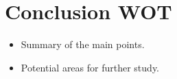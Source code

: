 \documentclass[11pt]{article}
\begin{document}
\section{Conclusion WOT}
\begin{itemize}
    \item Summary of the main points.
    \item Potential areas for further study.
\end{itemize}

% 
% 
\end{document}
